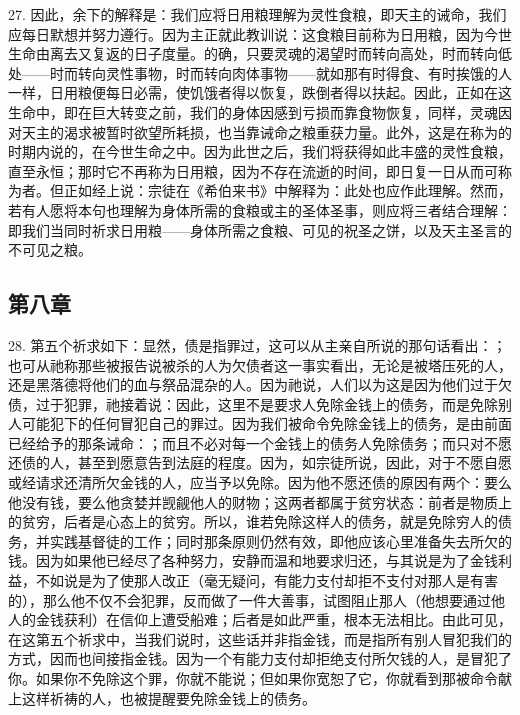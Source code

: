 27. 因此，余下的解释是：我们应将日用粮理解为灵性食粮，即天主的诫命，我们应每日默想并努力遵行。因为主正就此教训说：这食粮目前称为日用粮，因为今世生命由离去又复返的日子度量。的确，只要灵魂的渴望时而转向高处，时而转向低处——时而转向灵性事物，时而转向肉体事物——就如那有时得食、有时挨饿的人一样，日用粮便每日必需，使饥饿者得以恢复，跌倒者得以扶起。因此，正如在这生命中，即在巨大转变之前，我们的身体因感到亏损而靠食物恢复，同样，灵魂因对天主的渴求被暂时欲望所耗损，也当靠诫命之粮重获力量。此外，这是在称为的时期内说的，在今世生命之中。因为此世之后，我们将获得如此丰盛的灵性食粮，直至永恒；那时它不再称为日用粮，因为不存在流逝的时间，即日复一日从而可称为者。但正如经上说：宗徒在《希伯来书》中解释为：此处也应作此理解。然而，若有人愿将本句也理解为身体所需的食粮或主的圣体圣事，则应将三者结合理解：即我们当同时祈求日用粮——身体所需之食粮、可见的祝圣之饼，以及天主圣言的不可见之粮。\par


\subsection{第八章}

28. 第五个祈求如下：显然，债是指罪过，这可以从主亲自所说的那句话看出：；也可从祂称那些被报告说被杀的人为欠债者这一事实看出，无论是被塔压死的人，还是黑落德将他们的血与祭品混杂的人。因为祂说，人们以为这是因为他们过于欠债，过于犯罪，祂接着说：因此，这里不是要求人免除金钱上的债务，而是免除别人可能犯下的任何冒犯自己的罪过。因为我们被命令免除金钱上的债务，是由前面已经给予的那条诫命：；而且不必对每一个金钱上的债务人免除债务；而只对不愿还债的人，甚至到愿意告到法庭的程度。因为，如宗徒所说，因此，对于不愿自愿或经请求还清所欠金钱的人，应当予以免除。因为他不愿还债的原因有两个：要么他没有钱，要么他贪婪并觊觎他人的财物；这两者都属于贫穷状态：前者是物质上的贫穷，后者是心态上的贫穷。所以，谁若免除这样人的债务，就是免除穷人的债务，并实践基督徒的工作；同时那条原则仍然有效，即他应该心里准备失去所欠的钱。因为如果他已经尽了各种努力，安静而温和地要求归还，与其说是为了金钱利益，不如说是为了使那人改正（毫无疑问，有能力支付却拒不支付对那人是有害的），那么他不仅不会犯罪，反而做了一件大善事，试图阻止那人（他想要通过他人的金钱获利）在信仰上遭受船难；后者是如此严重，根本无法相比。由此可见，在这第五个祈求中，当我们说时，这些话并非指金钱，而是指所有别人冒犯我们的方式，因而也间接指金钱。因为一个有能力支付却拒绝支付所欠钱的人，是冒犯了你。如果你不免除这个罪，你就不能说；但如果你宽恕了它，你就看到那被命令献上这样祈祷的人，也被提醒要免除金钱上的债务。\par

